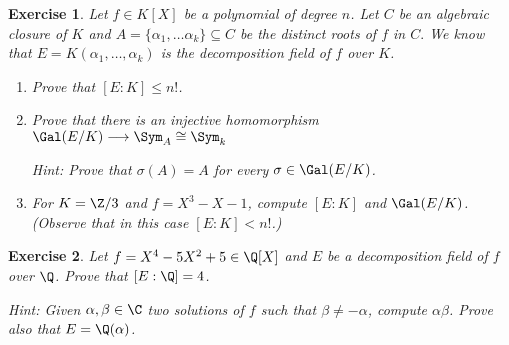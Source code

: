 \documentclass[a4paper,10pt,reqno]{amsart}
\newtheorem{ex}{Exercise}[section]
\newenvironment{sol}
  {\renewcommand\qedsymbol{$\blacksquare$}\begin{proof}[Solution]}
  {\end{proof}}
\begin{document}
\begin{ex}
    Let $f\in K[X]$ be a polynomial of degree $n$.
    Let $C$ be an algebraic closure of $K$ and $A=\{\alpha_1,\dots\alpha_k\}\subseteq C$ be the distinct roots of $f$ in $C.$
    We know that $E=K(\alpha_1,\dots,\alpha_k)$ is the decomposition field of $f$ over $K$.
    \begin{enumerate}[label=(\roman*)]
    \item Prove that $[E:K]\leq n! $.
    \item Prove that there is an injective homomorphism $\Gal(E/K)\longrightarrow \Sym_{A}\cong \Sym_k$ 
    
    \noindent\textit{Hint: } Prove that $\sigma(A)=A$ for every $\sigma \in \Gal(E/K)$.
    \item For $K=\Z/3$ and $f=X^3-X-1$, compute $[E:K]$ and $\Gal(E/K)$.
    (Observe that in this case $[E:K]<n!$.)
    \end{enumerate}
\end{ex}



\begin{ex}
    Let $f=X^4-5X^2+5\in \Q[X]$ and $E$ be a decomposition field of $f$ over $\Q$. 
    Prove that $[E:\Q]=4$. 

    \textit{Hint:}
    Given $\alpha,\beta\in \C$
    two solutions of $f$ such that $\beta\neq-\alpha$,
    compute $\alpha\beta$.
    Prove also that $E=\Q(\alpha)$.
\end{ex}



\newpage





\end{document}
